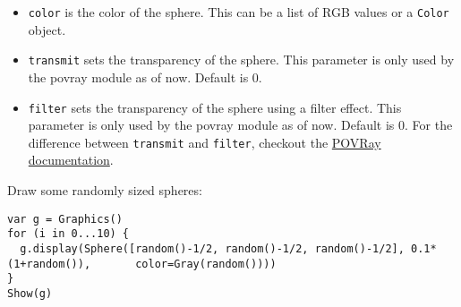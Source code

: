 \begin{itemize}

\item
  \texttt{color} is the color of the sphere. This can be a list of RGB
  values or a \texttt{Color} object.
\item
  \texttt{transmit} sets the transparency of the sphere. This parameter
  is only used by the povray module as of now. Default is 0.
\item
  \texttt{filter} sets the transparency of the sphere using a filter
  effect. This parameter is only used by the povray module as of now.
  Default is 0. For the difference between \texttt{transmit} and
  \texttt{filter}, checkout the
  \href{http://xahlee.info/3d/povray-glassy.html}{POVRay documentation}.
\end{itemize}

Draw some randomly sized spheres:

\begin{lstlisting}
var g = Graphics()
for (i in 0...10) {
  g.display(Sphere([random()-1/2, random()-1/2, random()-1/2], 0.1*(1+random()),       color=Gray(random())))
}
Show(g)
\end{lstlisting}
